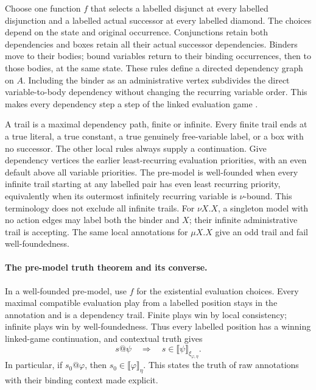 Choose one function \(f\)
that selects a labelled
disjunct at every labelled
disjunction and a labelled
actual successor at every
labelled diamond.
The choices depend on the
state and original occurrence.
Conjunctions retain both
dependencies and boxes retain
all their actual successor
dependencies. Binders move to
their bodies; bound variables
return to their binding
occurrences, then to those
bodies, at the same state.
These rules define a directed
dependency graph on \(A\).
Including the binder as an
administrative vertex subdivides
the direct variable-to-body
dependency without changing
the recurring variable order.
This makes every dependency
step a step of the linked
evaluation game
\cite[\S3.6]{BradfieldStirling2007}.

A trail is a maximal dependency
path, finite or infinite.
Every finite trail ends at
a true literal, a true
constant, a true genuinely
free-variable label, or a
box with no successor.
The other local rules
always supply a continuation.
Give dependency vertices the
earlier least-recurring
evaluation priorities, with
an even default above all
variable priorities.
The pre-model is well-founded
when every infinite trail
starting at any labelled pair
has even least recurring
priority, equivalently when
its outermost infinitely
recurring variable is
\(\nu\)-bound.
This terminology does not
exclude all infinite trails.
For \(\nu X.X\), a singleton
model with no action edges
may label both the binder
and \(X\); their infinite
administrative trail is accepting.
The same local annotations for
\(\mu X.X\) give an odd
trail and fail well-foundedness.

\paragraph{The pre-model truth theorem and its converse.}
In a well-founded pre-model,
use \(f\) for the existential
evaluation choices.
Every maximal compatible evaluation
play from a labelled position
stays in the annotation and
is a dependency trail.
Finite plays win by local
consistency; infinite plays
win by well-foundedness.
Thus every labelled position
has a winning linked-game
continuation, and contextual
truth gives
\[
 s@\psi\quad\Longrightarrow\quad
 s\in\llbracket\psi\rrbracket_{\xi_{\varphi,\eta}}.
\]
In particular, if \(s_0@\varphi\),
then
\(s_0\in\llbracket\varphi\rrbracket_\eta\).
This states the truth of
raw annotations with their
binding context made explicit.

